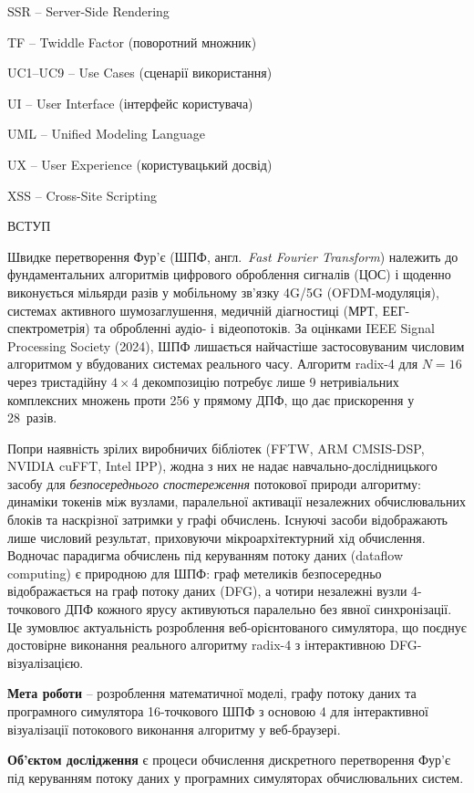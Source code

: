 \documentclass[
]{article}
\begin{document}
SSR -- Server-Side Rendering

TF -- Twiddle Factor (поворотний множник)

UC1--UC9 -- Use Cases (сценарії використання)

UI -- User Interface (інтерфейс користувача)

UML -- Unified Modeling Language

UX -- User Experience (користувацький досвід)

XSS -- Cross-Site Scripting

\textbf{\hfill\break
}

\protect{}\label{_Toc230130250}{}ВСТУП

Швидке перетворення Фур'є (ШПФ, англ.~\emph{Fast Fourier Transform})
належить до фундаментальних алгоритмів цифрового оброблення сигналів
(ЦОС) і щоденно виконується мільярди разів у мобільному зв'язку 4G/5G
(OFDM-модуляція), системах активного шумозаглушення, медичній
діагностиці (МРТ, ЕЕГ-спектрометрія) та обробленні аудіо- і
відеопотоків. За оцінками IEEE Signal Processing Society (2024), ШПФ
лишається найчастіше застосовуваним числовим алгоритмом у вбудованих
системах реального часу. Алгоритм radix-4 для \(N = 16\) через
тристадійну \(4 \times 4\) декомпозицію потребує лише 9 нетривіальних
комплексних множень проти 256 у прямому ДПФ, що дає прискорення у
28~разів.

Попри наявність зрілих виробничих бібліотек (FFTW, ARM CMSIS-DSP, NVIDIA
cuFFT, Intel IPP), жодна з них не надає навчально-дослідницького засобу
для \emph{безпосереднього спостереження} потокової природи алгоритму:
динаміки токенів між вузлами, паралельної активації незалежних
обчислювальних блоків та наскрізної затримки у графі обчислень. Існуючі
засоби відображають лише числовий результат, приховуючи
мікроархітектурний хід обчислення. Водночас парадигма обчислень під
керуванням потоку даних (dataflow computing) є природною для ШПФ: граф
метеликів безпосередньо відображається на граф потоку даних (DFG), а
чотири незалежні вузли 4-точкового ДПФ кожного ярусу активуються
паралельно без явної синхронізації. Це зумовлює актуальність розроблення
веб-орієнтованого симулятора, що поєднує достовірне виконання реального
алгоритму radix-4 з інтерактивною DFG-візуалізацією.

\textbf{Мета роботи} -- розроблення математичної моделі, графу потоку
даних та програмного симулятора 16-точкового ШПФ з основою 4 для
інтерактивної візуалізації потокового виконання алгоритму у
веб-браузері.

\textbf{Об'єктом дослідження} є процеси обчислення дискретного
перетворення Фур'є під керуванням потоку даних у програмних симуляторах
обчислювальних систем.
\end{document}
